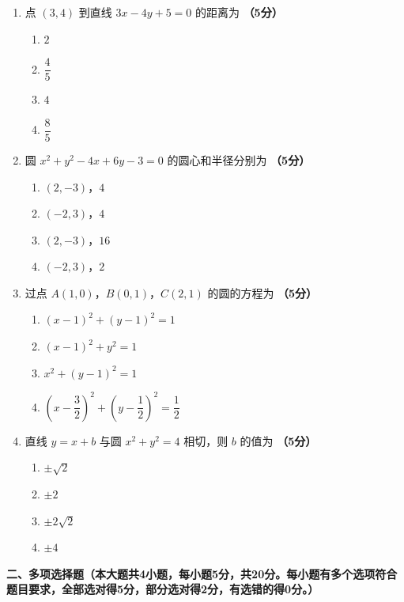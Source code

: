 \documentclass[12pt, a4paper]{ctexart}
\newcommand{\score}[1]{\hfill\textbf{（#1分）}}
\begin{document}
\begin{enumerate}
\item 点 $(3,4)$ 到直线 $3x-4y+5=0$ 的距离为 \score{5}
\begin{enumerate}[label=\Alph*.]
\item $2$
\item $\dfrac{4}{5}$
\item $4$
\item $\dfrac{8}{5}$
\end{enumerate}

\item 圆 $x^2+y^2-4x+6y-3=0$ 的圆心和半径分别为 \score{5}
\begin{enumerate}[label=\Alph*.]
\item $(2,-3)$，$4$
\item $(-2,3)$，$4$
\item $(2,-3)$，$16$
\item $(-2,3)$，$2$
\end{enumerate}

\item 过点 $A(1,0)$，$B(0,1)$，$C(2,1)$ 的圆的方程为 \score{5}
\begin{enumerate}[label=\Alph*.]
\item $(x-1)^2+(y-1)^2=1$
\item $(x-1)^2+y^2=1$
\item $x^2+(y-1)^2=1$
\item $(x-\dfrac{3}{2})^2+(y-\dfrac{1}{2})^2=\dfrac{1}{2}$
\end{enumerate}

\item 直线 $y=x+b$ 与圆 $x^2+y^2=4$ 相切，则 $b$ 的值为 \score{5}
\begin{enumerate}[label=\Alph*.]
\item $\pm\sqrt{2}$
\item $\pm 2$
\item $\pm 2\sqrt{2}$
\item $\pm 4$
\end{enumerate}
\end{enumerate}

\vspace{1em}

\noindent\textbf{二、多项选择题（本大题共4小题，每小题5分，共20分。每小题有多个选项符合题目要求，全部选对得5分，部分选对得2分，有选错的得0分。）}

\vspace{0.5em}
\end{document}
